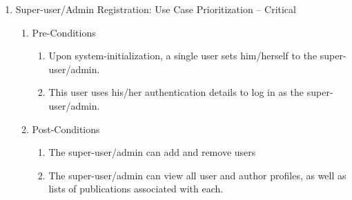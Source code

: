 \documentclass[hidelinks,a4paper,12pt]{article}
\begin{document}
\noindent  

\begin{enumerate}
	\item  Super-user/Admin Registration: Use Case Prioritization -- Critical
	
	\begin{enumerate}
		\item  Pre-Conditions
		
		\begin{enumerate}
			\item  Upon system-initialization, a single user sets him/herself to the super-user/admin.
			
			\item  This user uses his/her authentication details to log in as the super-user/admin.
		\end{enumerate}
		
		\item  Post-Conditions
		
		\begin{enumerate}
			\item  The super-user/admin can add and remove users
			
			\item  The super-user/admin can view all user and author profiles, as well as lists of publications associated with each.
		\end{enumerate}
	\end{enumerate}
\end{enumerate}

\noindent  
\end{document}

